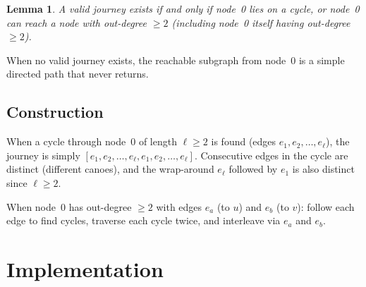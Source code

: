 \documentclass[11pt,a4paper]{article}
\newtheorem{lemma}[theorem]{Lemma}
\begin{document}
\begin{lemma}
A valid journey exists if and only if node~0 lies on a cycle, or
node~0 can reach a node with out-degree $\ge 2$ (including node~0
itself having out-degree $\ge 2$).
\end{lemma}

When no valid journey exists, the reachable subgraph from node~0 is a
simple directed path that never returns.

\subsection{Construction}

When a cycle through node~0 of length $\ell \ge 2$ is found (edges
$e_1, e_2, \ldots, e_\ell$), the journey is simply
$[e_1, e_2, \ldots, e_\ell, e_1, e_2, \ldots, e_\ell]$.  Consecutive
edges in the cycle are distinct (different canoes), and the wrap-around
$e_\ell$ followed by $e_1$ is also distinct since $\ell \ge 2$.

When node~0 has out-degree $\ge 2$ with edges $e_a$ (to $u$) and $e_b$
(to $v$): follow each edge to find cycles, traverse each cycle twice,
and interleave via $e_a$ and $e_b$.

\section{Implementation}
\end{document}
